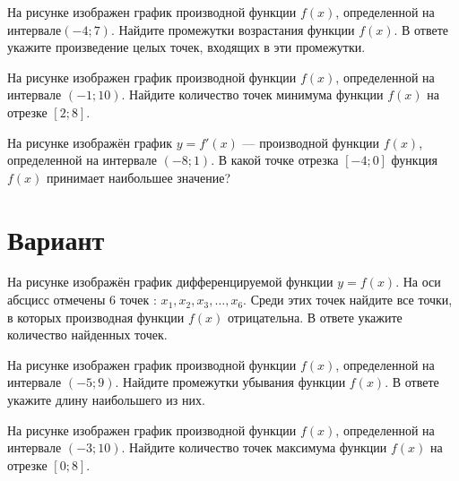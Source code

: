 \begin{taskBN}{2}
На рисунке изображен график производной функции $f(x)$, определенной на интервале$(-4; 7)$. Найдите промежутки возрастания функции $f(x)$. В ответе укажите произведение целых точек, входящих в эти промежутки.
\end{taskBN}

\begin{taskBN}{3}
На рисунке изображен график производной функции $f(x)$, определенной на интервале $(-1;10)$. Найдите количество точек минимума функции $f(x)$ на отрезке $[2;8]$. 
\end{taskBN}

\begin{taskBN}{4}
На рисунке изображён график $y=f'(x)$ — производной функции $f(x)$, определенной на интервале $(-8;1)$. В какой точке отрезка $[-4; 0]$ функция $f(x)$ принимает наибольшее значение?
\end{taskBN}

\newpage\section{Вариант}\begin{taskBN}{1}
На рисунке изображён график дифференцируемой функции $y=f(x)$. На оси абсцисс отмечены 6 точек : $x_1, x_2, x_3, \dots, x_6$. Среди этих точек найдите все точки, в которых производная функции $f(x)$ отрицательна. В ответе укажите количество найденных точек.
\end{taskBN}

\begin{taskBN}{2}
На рисунке изображен график производной функции $f(x)$, определенной на интервале $(-5;9)$. Найдите промежутки убывания функции $f(x)$. В ответе укажите длину наибольшего из них.
\end{taskBN}

\begin{taskBN}{3}
На рисунке изображен график производной функции $f(x)$, определенной на интервале $(-3;10)$. Найдите количество точек максимума функции $f(x)$ на отрезке $[0;8]$. 
\end{taskBN}

